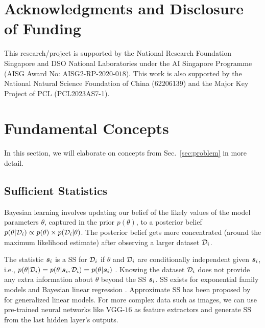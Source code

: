 \documentclass{article}
\theoremstyle{plain}
\theoremstyle{definition}
\theoremstyle{remark}
\renewcommand{\citet}[1]{\cite{#1}}
\begin{document}
\section*{Acknowledgments and Disclosure of Funding}
This research/project is supported by the National Research Foundation Singapore and DSO National Laboratories under the AI Singapore Programme (AISG Award No: AISG$2$-RP-$2020$-$018$). This work is also supported by the National Natural Science Foundation of China (62206139) and the Major Key Project of PCL (PCL2023AS7-1).

\clearpage





\clearpage

\appendix



\section{Fundamental Concepts}\label{app:fundamental}

In this section, we will elaborate on concepts from Sec.~\ref{sec:problem} in more detail.

\subsection{Sufficient Statistics}\label{app:sub:ss}

Bayesian learning involves updating our belief of the likely values of the model parameters $\theta$, captured in the prior $p(\theta)$, to a posterior belief $p(\theta|{\mathcal{D}}_i) \propto p(\theta) \times p({\mathcal{D}}_i|\theta)$. The posterior belief gets more concentrated (around the maximum likelihood estimate) after observing a larger dataset ${\mathcal{D}}_i$.

The statistic ${\bm{s}}_i$ is a SS for ${\mathcal{D}}_i$ if $\theta$ and ${\mathcal{D}}_i$ are conditionally independent given ${\bm{s}}_i$, i.e., ${p(\theta | {\mathcal{D}}_i) = p(\theta | {\bm{s}}_i, 
{\mathcal{D}}_i) = p(\theta | {\bm{s}}_i)}$ \cite{ss_def,titsias2009variational}. Knowing the dataset ${\mathcal{D}}_i$ does not provide any extra information about $\theta$ beyond the SS ${\bm{s}}_i$.
SS exists for exponential family models \cite{bishop2006pattern} and Bayesian linear regression \cite{murphy2022probabilistic}. Approximate SS has been proposed by~\citet{huggins2017pass} for generalized linear models. For more complex data such as images, we can use pre-trained neural networks like VGG-$16$ as feature extractors and generate SS from the last hidden layer's outputs.
\end{document}
